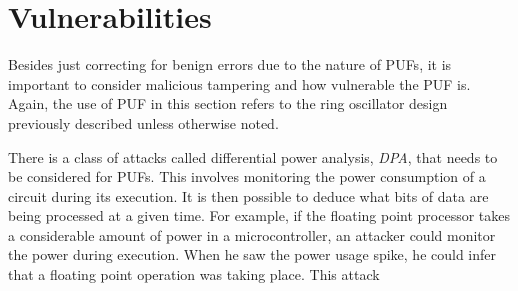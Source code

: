 \section{Vulnerabilities}
Besides just correcting for benign errors due to the nature of PUFs, it is important to consider
malicious tampering and how vulnerable the PUF is. Again, the use of PUF in this section refers
to the ring oscillator design previously described unless otherwise noted.

There is a class of attacks called differential power analysis, \textit{DPA}, that needs to be considered
for PUFs. This involves monitoring the power consumption of a circuit during its execution. It is then possible
to deduce what bits of data are being processed at a given time. For example, if the floating point processor
takes a considerable amount of power in a microcontroller, an attacker could monitor the power during execution.
When he saw the power usage spike, he could infer that a floating point operation was taking place. This attack
